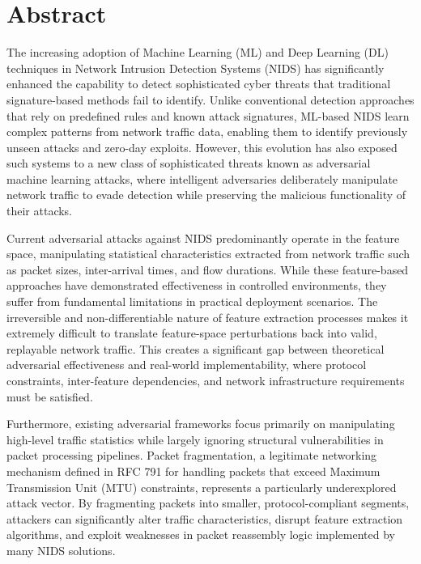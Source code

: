 \chapter*{Abstract} %
\label{abstract}


The increasing adoption of Machine Learning (ML) and Deep Learning (DL) techniques in Network Intrusion Detection Systems (NIDS) has significantly enhanced the capability to detect sophisticated cyber threats that traditional signature-based methods fail to identify. Unlike conventional detection approaches that rely on predefined rules and known attack signatures, ML-based NIDS learn complex patterns from network traffic data, enabling them to identify previously unseen attacks and zero-day exploits. However, this evolution has also exposed such systems to a new class of sophisticated threats known as adversarial machine learning attacks, where intelligent adversaries deliberately manipulate network traffic to evade detection while preserving the malicious functionality of their attacks.

Current adversarial attacks against NIDS predominantly operate in the feature space, manipulating statistical characteristics extracted from network traffic such as packet sizes, inter-arrival times, and flow durations. While these feature-based approaches have demonstrated effectiveness in controlled environments, they suffer from fundamental limitations in practical deployment scenarios. The irreversible and non-differentiable nature of feature extraction processes makes it extremely difficult to translate feature-space perturbations back into valid, replayable network traffic. This creates a significant gap between theoretical adversarial effectiveness and real-world implementability, where protocol constraints, inter-feature dependencies, and network infrastructure requirements must be satisfied.

Furthermore, existing adversarial frameworks focus primarily on manipulating high-level traffic statistics while largely ignoring structural vulnerabilities in packet processing pipelines. Packet fragmentation, a legitimate networking mechanism defined in RFC 791 for handling packets that exceed Maximum Transmission Unit (MTU) constraints, represents a particularly underexplored attack vector. By fragmenting packets into smaller, protocol-compliant segments, attackers can significantly alter traffic characteristics, disrupt feature extraction algorithms, and exploit weaknesses in packet reassembly logic implemented by many NIDS solutions.

